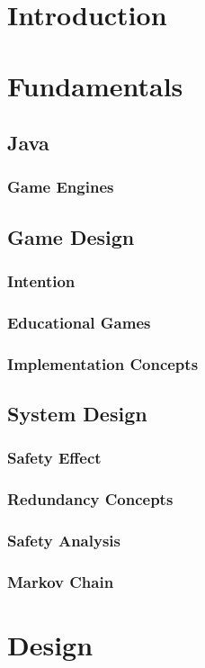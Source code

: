 \documentclass[11pt]{article}
\begin{document}
    \tableofcontents
    \newpage

    \section{Introduction}
    \section{Fundamentals}
    \subsection{Java}
    \subsubsection{Game Engines}
    \subsection{Game Design}
    \subsubsection{Intention}
    \subsubsection{Educational Games}
    \subsubsection{Implementation Concepts}
    \subsection{System Design}
    \subsubsection{Safety Effect}
    \subsubsection{Redundancy Concepts}
    \subsubsection{Safety Analysis}
    \subsubsection{Markov Chain}
    \section{Design}
\end{document}
